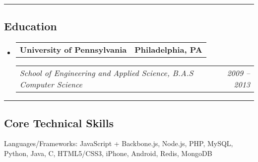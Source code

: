 \documentclass[10pt,letterpaper]{article}
\makeatletter
\newenvironment{indentsection}[1]%
{\begin{list}{}%
  {\setlength{\leftmargin}{#1}}%
  \item[]%
}
{\end{list}}
\newcommand{\headerrow}[2]
{\begin{tabular*}{\linewidth}{l@{\extracolsep{\fill}}r}
  #1 &
  #2 \\
\end{tabular*}}
\makeatother
\begin{document}
\hrule
\vspace{-0.4em}
\subsection*{Education}

\begin{itemize}
  \parskip=0.1em

  \item 
  \headerrow
    {\textbf{University of Pennsylvania}}
    {\textbf{Philadelphia, PA}}
  
  \headerrow
    {\emph{School of Engineering and Applied Science, B.A.S Computer Science}}
    {\emph{2009 -- 2013}}

\end{itemize}


\hrule
\vspace{-0.4em}
\subsection*{Core Technical Skills}

\begin{indentsection}{\parindent}
\begin{description*}
  \item[Languages/Frameworks:]
  JavaScript + Backbone.js, Node.js, PHP, MySQL, Python, Java, C, HTML5/CSS3, iPhone, Android, Redis, MongoDB
\end{description*}
\end{indentsection}
\end{document}
